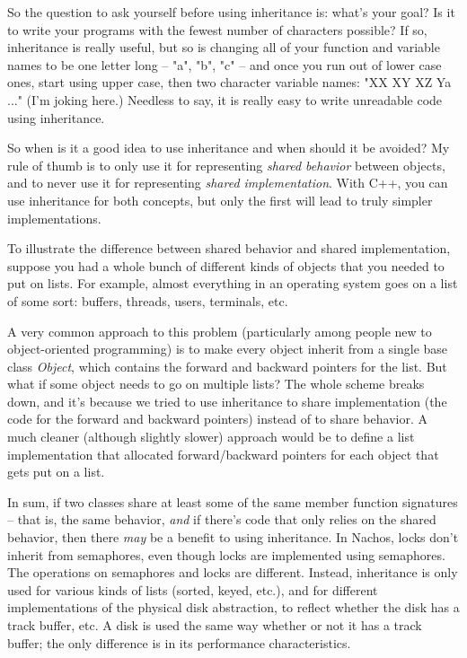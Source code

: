 So the question to ask yourself before using inheritance is:
what's your goal?  Is it to write your programs with the
fewest number of characters possible?  If so, inheritance is
really useful, but so is changing all of your function and variable
names to be one letter long -- "a", "b", "c" -- and once you
run out of lower case ones, start using upper case, then two character
variable names: "XX XY XZ Ya ..." (I'm joking here.)
Needless to say, it is really easy to write unreadable code
using inheritance.

So when is it a good idea to use inheritance and when should it be
avoided?  My rule of thumb is to only use it for representing
{\em shared behavior} between objects, and to never use it for
representing {\em shared implementation}.  With C++, you can use
inheritance for both concepts, but only the first will lead to
truly simpler implementations.

To illustrate the difference between shared behavior and shared
implementation, suppose you had a whole bunch of different kinds
of objects that you needed to put on lists.  For example, almost everything
in an operating system goes on a list of some sort: buffers, threads,
users, terminals, etc.

A very common approach to this problem (particularly among people new
to object-oriented programming) is to make every object inherit from
a single base class {\em Object}, which contains the forward and backward
pointers for the list.  But what if some object needs to go on multiple
lists?  The whole scheme breaks down, and it's because we tried to use
inheritance to share implementation (the code for the forward and backward
pointers) instead of to share behavior.  A much cleaner (although slightly
slower) approach would
be to define a list implementation that allocated forward/backward
pointers for each object that gets put on a list.

In sum, if two classes share at least some of the same member function
signatures -- that is, the same behavior, {\em and} if there's code that
only relies on the shared behavior, then there {\em may}
be a benefit to using inheritance.  In Nachos, locks don't inherit from
semaphores, even though locks are implemented using semaphores.  The
operations on semaphores and locks are different.  Instead, inheritance is
only used for various kinds of lists (sorted, keyed, etc.),
and for different implementations of the physical disk abstraction,
to reflect whether the disk has a track buffer, etc.  A disk is used
the same way whether or not it has a track buffer; the only difference is
in its performance characteristics.


